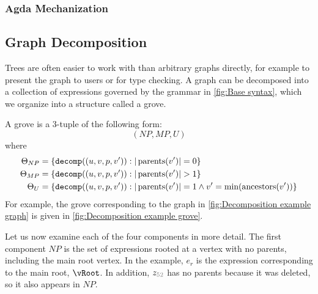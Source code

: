 \subsubsection{Agda Mechanization}%
\label{sub:Agda Mechanization}

\subsection{Graph Decomposition}%
\label{sub:Graph Decomposition}



Trees are often easier to work with than arbitrary graphs directly, for example to present the graph to users or for type checking.
A graph can be decomposed into a collection of expressions governed by the grammar in \autoref{fig:Base syntax}, which we organize into a structure called a grove.

\figureDecompExample


A grove is a 3-tuple of the following form:
\[
  (NP, MP, U)
\]
where
\begin{align*}
  \figureDecompositionDefDecompComponents
\end{align*}
For example, the grove corresponding to the graph in \autoref{fig:Decomposition example graph} is
given in \autoref{fig:Decomposition example grove}.

\figureDecompositionDef

\figureDecompositionDefHelpers

Let us now examine each of the four components in more detail.
%
The first component $NP$ is the set of expressions rooted at a vertex with no parents, including the main root vertex.
In the example, $e_r$ is the expression corresponding to the main root, $\vRoot$.
In addition, $z_{\id{52}}$ has no parents because it was deleted, so it also appears in $NP$.

